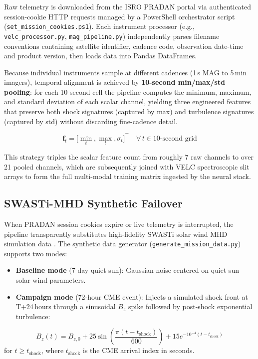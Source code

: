 \documentclass[conference,10pt,twocolumn]{IEEEtran}
\begin{document}
Raw telemetry is downloaded from the ISRO PRADAN portal via authenticated session-cookie HTTP requests managed by a PowerShell orchestrator script (\texttt{set\_mission\_cookies.ps1}). Each instrument processor (e.g., \texttt{velc\_processor.py}, \texttt{mag\_pipeline.py}) independently parses filename conventions containing satellite identifier, cadence code, observation date-time and product version, then loads data into Pandas DataFrames.

Because individual instruments sample at different cadences (1\,s MAG to 5\,min imagers), temporal alignment is achieved by \textbf{10-second min/max/std pooling}: for each 10-second cell the pipeline computes the minimum, maximum, and standard deviation of each scalar channel, yielding three engineered features that preserve both shock signatures (captured by max) and turbulence signatures (captured by std) without discarding fine-cadence detail.

\begin{equation}
\mathbf{f}_{t} = \bigl[\min_{t}, \max_{t}, \sigma_{t}\bigr]^{\!\top} \quad \forall\, t \in 10\text{-second grid}
\label{eq:pooling}
\end{equation}

This strategy triples the scalar feature count from roughly 7 raw channels to over 21 pooled channels, which are subsequently joined with VELC spectroscopic slit arrays to form the full multi-modal training matrix ingested by the neural stack.

\subsection{SWASTi-MHD Synthetic Failover}

When PRADAN session cookies expire or live telemetry is interrupted, the pipeline transparently substitutes high-fidelity SWASTi solar wind MHD simulation data \cite{b7}. The synthetic data generator (\texttt{generate\_mission\_data.py}) supports two modes:
\begin{itemize}
  \item \textbf{Baseline mode} (7-day quiet sun): Gaussian noise centered on quiet-sun solar wind parameters.
  \item \textbf{Campaign mode} (72-hour CME event): Injects a simulated shock front at T+24\,hours through a sinusoidal $B_z$ spike followed by post-shock exponential turbulence:
\end{itemize}
\begin{equation}
B_z(t) = B_{z,0} + 25\sin\!\left(\frac{\pi(t-t_{\text{shock}})}{600}\right) + 15e^{-10^{-4}(t-t_{\text{shock}})}
\label{eq:shock}
\end{equation}
for $t \geq t_{\text{shock}}$, where $t_{\text{shock}}$ is the CME arrival index in seconds.
\end{document}
